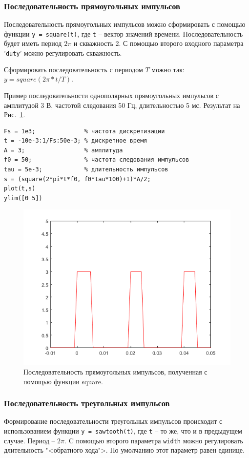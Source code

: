 \documentclass[12pt,a4paper]{article}
\begin{document}
\subsubsection{Последовательность прямоугольных импульсов}
Последовательность прямоугольных импульсов можно сформировать с помощью функции \verb|y = square(t)|, где \verb|t| -- вектор значений времени. Последовательность будет иметь период $2\pi$ и скважность 2. С помощью второго входного параметра '\verb|duty|' можно регулировать скважность.

Сформировать последовательность с периодом $T$ можно так: $y=square(2\pi*t/T)$.

Пример последовательности однополярных прямоугольных импульсов с амплитудой 3 В, частотой следования 50 Гц, длительностью 5 мс. Результат на Рис.~\ref{fig:img_square}.
\begin{verbatim}
Fs = 1e3;              % частота дискретизации
t = -10e-3:1/Fs:50e-3; % дискретное время
A = 3;                 % амплитуда
f0 = 50;               % частота следования импульсов
tau = 5e-3;            % длительность импульсов
s = (square(2*pi*t*f0, f0*tau*100)+1)*A/2;
plot(t,s)
ylim([0 5])
\end{verbatim}
\begin{figure}[!ht]
  \centering
  \includegraphics[width=\linewidth]{img_square}
  \caption{Последовательность прямоугольных импульсов, полученная с помощью функции square.}
  \label{fig:img_square}
\end{figure}

\subsubsection{Последовательность треугольных импульсов}
Формирование последовательности треугольных импульсов происходит с использованием функции \verb|y = sawtooth(t)|, где \verb|t| -- то же, что и в предыдущем случае. Период -- $2\pi$. C помощью второго параметра \verb|width| можно регулировать длительность "<обратного хода">. По умолчанию этот параметр равен единице.
\end{document}

